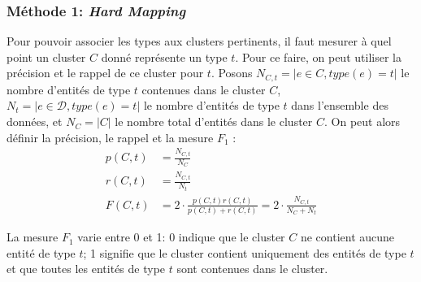 

\subsubsection{Méthode 1: \textit{Hard Mapping}}
\label{ssubsec:te-hardmapping}

Pour pouvoir associer les types aux clusters pertinents, il faut mesurer à quel point un cluster $C$ donné représente un type $t$. Pour ce faire, on peut utiliser la précision et le rappel de ce cluster pour $t$. Posons $N_{C,t} = | e \in C, type(e) = t|$ le nombre d'entités de type $t$ contenues dans le cluster $C$,
$N_t = |e \in \mathcal{D}, type(e) = t|$ le nombre d'entités de type $t$ dans l'ensemble des données, et $N_C = | C |$ le nombre total d'entités dans le cluster $C$. On peut alors définir la précision, le rappel et la mesure $F_1$ :
\begin{align}
    p(C, t) &= \frac{N_{C, t}}{N_C} \\
    r(C, t) &= \frac{N_{C, t}}{N_t} \\
    F(C, t) &= 2 \cdot \frac{p(C, t)r(C, t)}{p(C, t) + r(C, t)} = 2 \cdot \frac{N_{C,t}}{N_C + N_t}
\end{align}

La mesure $F_1$ varie entre 0 et 1: 0 indique que le cluster $C$ ne contient aucune entité de type $t$; 1 signifie que le cluster contient uniquement des entités de type $t$ et que toutes les entités de type $t$ sont contenues dans le cluster. 



